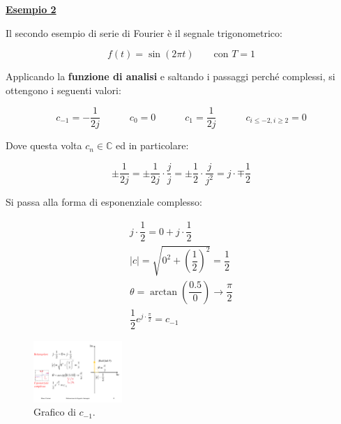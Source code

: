 \documentclass[a4paper]{article}
\begin{document}
	\newpage
	
	\noindent
	\textcolor{Green4}{\textbf{\underline{Esempio 2}}}\newline
	
	\noindent
	Il secondo esempio di serie di Fourier è il segnale trigonometrico:
	
	\begin{equation*}
		f\left(t\right) = \sin\left(2 \pi t\right) \hspace{2em} \text{con } T = 1
	\end{equation*}

	\noindent
	Applicando la \textbf{funzione di analisi} e saltando i passaggi perché complessi, si ottengono i seguenti valori:
	
	\begin{equation*}
		c_{-1} = -\dfrac{1}{2j} \hspace{3em}
		c_{0} = 0 \hspace{3em}
		c_{1} = \dfrac{1}{2j} \hspace{3em}
		c_{i \le -2, i \ge 2} = 0
	\end{equation*}

	\noindent
	Dove questa volta $c_{n} \in \mathbb{C}$ ed in particolare:
	
	\begin{equation*}
		\pm \dfrac{1}{2j} = \pm \dfrac{1}{2j} \cdot \dfrac{j}{j} = \pm \dfrac{1}{2} \cdot \dfrac{j}{j^{2}} = j \cdot \mp \dfrac{1}{2}
	\end{equation*}

	\noindent
	Si passa alla forma di esponenziale complesso:
	
	\begin{gather*}
		j \cdot \dfrac{1}{2} = 0 + j \cdot \dfrac{1}{2} \\
		|c| = \sqrt{0^{2} + \left(\dfrac{1}{2}\right)^{2}} = \dfrac{1}{2} \\
		\theta = \arctan\left(\dfrac{0.5}{0}\right) \rightarrow \dfrac{\pi}{2} \\
		\dfrac{1}{2} e^{j \cdot \frac{\pi}{2}} = c_{-1}
	\end{gather*}

	\begin{figure}[!htp]
		\centering
		\includegraphics[width=0.3\textwidth]{img/fourier_eg2.pdf}
		\caption{Grafico di $c_{-1}$.}
	\end{figure}
\end{document}

